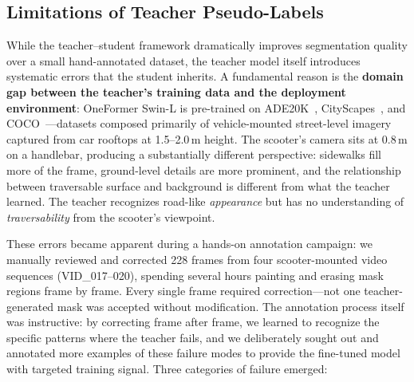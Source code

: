 \documentclass[12pt,letterpaper,oneside]{report}
\begin{document}
\subsection{Limitations of Teacher Pseudo-Labels}
\label{sec:teacher_limits}

While the teacher--student framework dramatically improves segmentation quality over a small hand-annotated dataset, the teacher model itself introduces systematic errors that the student inherits.  A fundamental reason is the \textbf{domain gap between the teacher's training data and the deployment environment}: OneFormer Swin-L is pre-trained on ADE20K~\cite{zhou2017ade20k}, CityScapes~\cite{cityscapes}, and COCO~\cite{coco}---datasets composed primarily of vehicle-mounted street-level imagery captured from car rooftops at 1.5--2.0\,m height.  The scooter's camera sits at 0.8\,m on a handlebar, producing a substantially different perspective: sidewalks fill more of the frame, ground-level details are more prominent, and the relationship between traversable surface and background is different from what the teacher learned.  The teacher recognizes road-like \emph{appearance} but has no understanding of \emph{traversability} from the scooter's viewpoint.

These errors became apparent during a hands-on annotation campaign: we manually reviewed and corrected 228 frames from four scooter-mounted video sequences (VID\_017--020), spending several hours painting and erasing mask regions frame by frame.  Every single frame required correction---not one teacher-generated mask was accepted without modification.  The annotation process itself was instructive: by correcting frame after frame, we learned to recognize the specific patterns where the teacher fails, and we deliberately sought out and annotated more examples of these failure modes to provide the fine-tuned model with targeted training signal.  Three categories of failure emerged:
\end{document}
